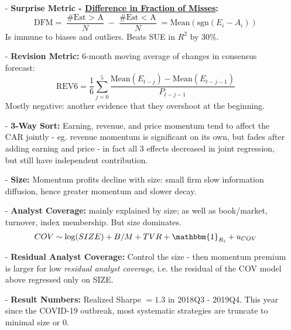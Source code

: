 \documentclass[9pt, landscape]{article}
\begin{document}
\begin{multicols*}{3}
\begin{itemize}
\begin{itemize}[leftmargin=10pt,noitemsep,topsep=0pt,partopsep=0pt]
		\item[-] \textbf{Surprise Metric - \href{https://papers.ssrn.com/sol3/papers.cfm?abstract_id=2473366}{Difference in Fraction of Misses}:}
		$$
		\text{DFM} = \frac{\text{\#Est $>$ A}}{N} - \frac{\text{\#Est $<$ A}}{N} = \text{Mean}( \text{sgn}(E_i-A_i) )
		$$
		Is immune to biases and outliers. Beats SUE in $R^2$ by 30\%.
		\item[-] \textbf{Revision Metric:} 6-month moving average of changes in consensus forecast:
		$$
		\text{REV6} = \frac{1}{6} \sum_{j=0}^5 \frac{\text{Mean}(E_{t-j}) -  \text{Mean}(E_{t-j-1})}{P_{t-j-1}}
		$$
		Mostly negative: another evidence that they overshoot at the beginning. 
		\item[-] \textbf{3-Way Sort:} Earning, revenue, and price momentum tend to affect the CAR jointly - eg. revenue momentum is significant on its own, but fades after adding earning and price - in fact all 3 effects decreased in joint regression, but still have independent contribution.
		\item[-] \textbf{Size:} Momentum profits decline with size: small firm slow information diffusion, hence greater momentum and slower decay.
		\item[-] \textbf{Analyst Coverage:} mainly explained by size; as well as book/market, turnover, index membership. But size dominates.
		$$
		COV \sim \log(SIZE) + B/M + TVR + \mathbbm{1}_{R_i}  + u_{COV}
		$$
		\item[-] \textbf{Residual Analyst Coverage:} Control the size - then momentum premium is larger for low \textit{residual analyst coverage}, i.e. the residual of the COV model above regressed only on SIZE.
		\item[-] \textbf{Result Numbers:} Realized Sharpe $=1.3$ in 2018Q3 - 2019Q4. This year since the COVID-19 outbreak, most systematic strategies are truncate to minimal size or 0.
	\end{itemize}
\end{itemize}


\end{multicols*}
\end{document}
